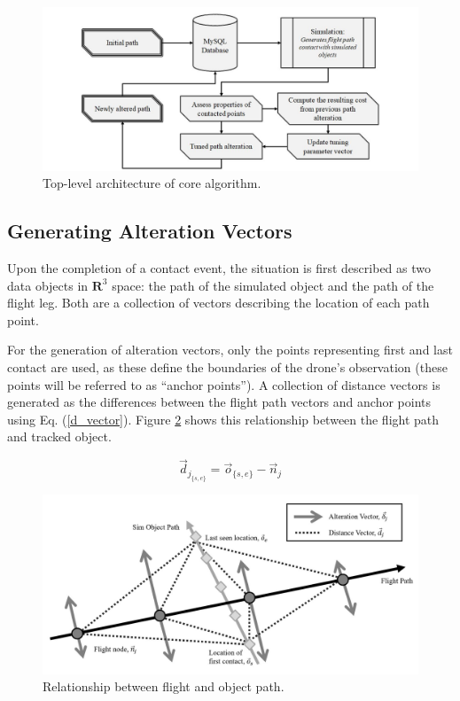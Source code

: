 \documentclass[conf]{new-aiaa}
\begin{document}
\begin{figure}[hbt!]
\centering
\includegraphics[width=1\textwidth]{figs/algo-architecture}
\caption{Top-level architecture of core algorithm.}
\label{algo-architecture}
\end{figure}

\subsection{Generating Alteration Vectors}
Upon the completion of a contact event, the situation is first described as two data objects in $\mathbf{R}^3$ space: the path of the simulated object and the path of the flight leg. Both are a collection of vectors describing the location of each path point.

For the generation of alteration vectors, only the points representing first and last contact are used, as these define the boundaries of the drone's observation (these points will be referred to as ``anchor points''). A collection of distance vectors is generated as the differences between the flight path vectors and anchor points using Eq. (\ref{d_vector}). Figure \ref{heuristic-diagram} shows this relationship between the flight path and tracked object.

\begin{equation}
\label{d_vector}
\vec{d}_{j_{\{s, e\}}} = \vec{o}_{\{s, e\}} - \vec{n}_j
\end{equation}

\begin{figure}[hbt!]
\centering
\includegraphics[width=1\textwidth]{figs/heuristic-diagram}
\caption{Relationship between flight and object path.}
\label{heuristic-diagram}
\end{figure}
\end{document}
